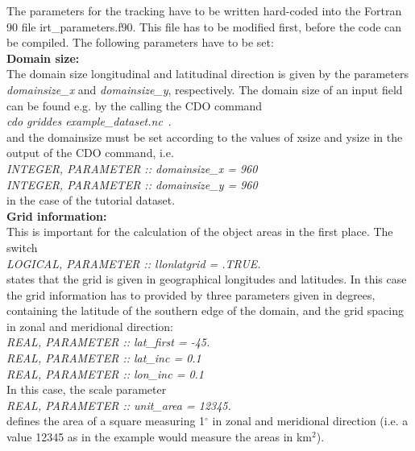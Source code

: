\documentclass[11pt]{article}
\begin{document}
The parameters for the tracking have to be written hard-coded into the Fortran 90 file irt\_parameters.f90. This file has to be modified first, before the code can be compiled. The following parameters have to be set:\vspace{0.5cm} \\
{\bf Domain size:}\\
The domain size longitudinal and latitudinal direction is given by the parameters {\it domainsize\_x} and {\it domainsize\_y}, respectively. The domain size of an input field can be found e.g. by the calling the CDO command\\
{\it cdo griddes example\_dataset.nc}\, . \\
and the domainsize must be set according to the values of xsize and ysize in the output of the CDO command, i.e.\\
{\it INTEGER, PARAMETER    :: domainsize\_x = 960}\\
{\it INTEGER, PARAMETER    :: domainsize\_y = 960}\\
in the case of the tutorial dataset.\vspace{0.5cm} \\
{\bf Grid information:}\\
This is important for the calculation of the object areas in the first place. The switch\\
{\it LOGICAL, PARAMETER    :: llonlatgrid = .TRUE.}\\
states that the grid is given in geographical longitudes and latitudes. In this case the grid information has to provided by three parameters given in degrees, containing the latitude of the southern edge of the domain, and the grid spacing in zonal and meridional direction: \\
{\it REAL, PARAMETER       :: lat\_first = -45.}\\
{\it REAL, PARAMETER       :: lat\_inc = 0.1}\\
{\it REAL, PARAMETER       :: lon\_inc = 0.1}\\
In this case, the scale parameter\\
{\it REAL, PARAMETER       :: unit\_area = 12345.}\\
defines the area of a square measuring 1$^\circ$ in zonal and meridional direction (i.e. a value 12345 as in the example would measure the areas in km$^2$).
\end{document}
